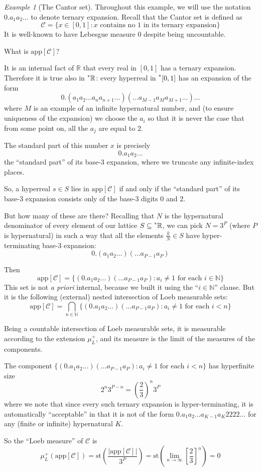 \documentclass[11pt]{amsart}
\theoremstyle{remark}
\newtheorem*{example}{Example}
\newcommand{\st}{\mathrm{st}}
\newcommand{\app}[1]{\mathrm{app}\left[#1\right]}
\newcommand{\hyp}[1][\mathbb{R}]{\prescript{*}{}{#1}}
\begin{document}
\begin{example}[The Cantor set]
Throughout this example, we will use the notation $0.a_1 a_2 \dots$ to denote ternary expansion.
Recall that the Cantor set is defined as $$\mathcal{C} = \{x \in [0,1] : \text{$x$ contains no $1$ in its ternary expansion} \}$$
It is well-known to have Lebesgue measure $0$ despite being uncountable.

What is $\app{\mathcal{C}}$?

It is an internal fact of $\mathbb{R}$ that every real in $[0,1]$ has a ternary expansion.
Therefore it is true also in $\hyp$: every hyperreal in $\hyp[[]0,1]$ has an expansion of the form 
$$0.(a_1 a_2 \dots a_n a_{n+1} \dots)(\dots a_{M-1} a_M a_{M+1} \dots)\dots $$
where $M$ is an example of an infinite hypernatural number, and (to ensure uniqueness of the expansion) we choose the $a_i$ so that it is never the case that from some point on, all the $a_j$ are equal to $2$.

The standard part of this number $x$ is precisely $$0.a_1 a_2 \dots$$
the ``standard part'' of its base-$3$ expansion, where we truncate any infinite-index places.

So, a hyperreal $s \in S$ lies in $\app{\mathcal{C}}$ if and only if the ``standard part'' of its base-$3$ expansion consists only of the base-$3$ digits $0$ and $2$.

But how many of these are there?
Recalling that $N$ is the hypernatural denominator of every element of our lattice $S \subseteq \hyp$, we can pick $N = 3^P$ (where $P$ is hypernatural) in such a way that all the elements $\frac{k}{N} \in S$ have hyper-terminating base-$3$ expansion:
$$0.(a_1 a_2 \dots)( \dots a_{P-1} a_P)$$

Then $$\app{\mathcal{C}} = \{ (0.a_1 a_2 \dots) (\dots a_{P-1} a_P) : \text{$a_i \not = 1$ for each $i \in \mathbb{N}$} \}$$
This set is not \emph{a priori} internal, because we built it using the ``$i \in \mathbb{N}$'' clause.
But it is the following (external) nested intersection of Loeb measurable sets:
$$\app{\mathcal{C}} = \bigcap_{n \in \mathbb{N}} \{ (0.a_1 a_2 \dots) (\dots a_{P-1} a_P) : \text{$a_i \not = 1$ for each $i < n$}\}$$

Being a countable intersection of Loeb measurable sets, it is measurable according to the extension $\mu_L^+$, and its measure is the limit of the measures of the components.

The component $\{ (0.a_1 a_2 \dots) (\dots a_{P-1} a_P) : \text{$a_i \not = 1$ for each $i < n$}\}$ has hyperfinite size $$2^n 3^{P-n} = \left(\frac{2}{3} \right)^n 3^P$$
where we note that since every such ternary expansion is hyper-terminating, it is auto\-matically ``acceptable'' in that it is not of the form $0.a_1 a_2 \dots a_{K-1} a_{K} 2222\dots$ for any (finite or infinite) hypernatural $K$.

So the ``Loeb measure'' of $\mathcal{C}$ is $$\mu_L^+(\app{\mathcal{C}}) = \st \left( \frac{|\app{\mathcal{C}}|}{3^P} \right) = \st \left( \lim_{n \to \infty} \left[\frac{2}{3} \right]^n \right) = 0$$
\end{example}
\end{document}
